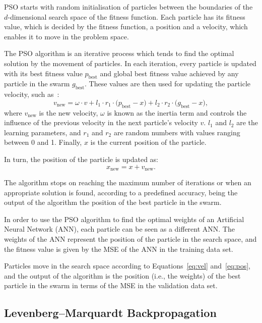PSO starts with random initialisation of particles between the boundaries of the $d$-dimensional search space of the fitness function. Each particle has its fitness value, which is decided by the fitness function, a position and a velocity, which enables it to move in the problem space.

The PSO algorithm is an iterative process which tends to find the optimal solution by the movement of particles. In each iteration, every particle is updated with its best fitness value $p_{\text{best}}$ and global best fitness value achieved by any particle in the swarm $g_{\text{best}}$. These values are then used for updating the particle velocity, such as~\cite{shi}:
\begin{equation}\label{eq:vel}
    v_{\text{new}}= \omega \cdot v + l_1 \cdot r_1 \cdot \Big( p_{\text{best}}-x \Big) + l_2\cdot r_2 \cdot \Big(g_{\text{best}}-x \Big),
\end{equation}
where $v_{\text{new}}$ is the new velocity, $\omega$ is known as the inertia term and controls the influence of the 
previous velocity in the next particle's velocity $v$. $l_1$ and $l_2$ are the learning parameters, and $r_1$ and $r_2$ are random numbers with values ranging between 0 and 1. Finally, $x$ is the current position of the particle.

In turn, the position of the particle is updated as:
 \begin{equation}\label{eq:pos}
    x_{\text{new}} = x + v_{\text{new}}.
 \end{equation}
 
The algorithm stops on reaching the maximum number of iterations or when an appropriate solution is found, according to a predefined accuracy, being the output of the algorithm the position of the best particle in the swarm. 

In order to use the PSO algorithm to find the optimal weights of an Artificial Neural Network (ANN), each particle can be seen as a different ANN. The weights of the ANN represent the position of the particle in the search space, and the fitness value is given by the MSE of the ANN in the training data set.

Particles move in the search space according to Equations~\eqref{eq:vel} and~\eqref{eq:pos}, and the output of the algorithm is the position (i.e., the weights) of the best particle in the swarm in terms of the MSE in the validation data set. 

\subsection{Levenberg--Marquardt Backpropagation}

